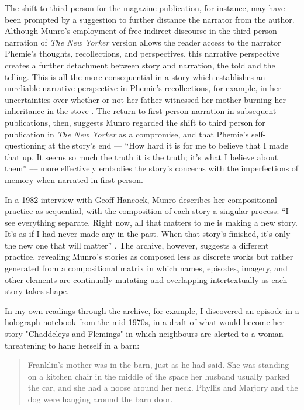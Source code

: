 \begin{paper}
The shift to third person for the magazine publication, for instance, may have been prompted by a suggestion to further distance the narrator from the author. Although Munro's employment of free indirect discourse in the
third-person narration of \emph{The New Yorker} version allows the
reader access to the narrator Phemie's thoughts, recollections, and
perspectives, this narrative perspective creates a further detachment
between story and narration, the told and the telling. This is all the
more consequential in a story which establishes an unreliable narrative
perspective in Phemie's recollections, for example, in her uncertainties
over whether or not her father witnessed her mother burning her
inheritance in the stove \citep[28--29]{munro_progress_1986}. The return to first person narration in subsequent publications, then, suggests Munro regarded the
shift to third person for publication in \emph{The New Yorker} as a
compromise, and that Phemie's self-questioning at the story's
end –– ``How hard it is for me to believe that I made that up. It seems
so much the truth it is the truth; it's what I believe about them''
\citep[30]{munro_progress_1986} –– more effectively embodies the story's concerns with
the imperfections of memory when narrated in first person.

In a 1982 interview with Geoff Hancock, Munro describes her
compositional practice as sequential, with the composition of each story
a singular process: ``I see everything separate. Right now, all that
matters to me is making a new story. It's as if I had never made any in
the past. When that story's finished, it's only the new one that will
matter'' \citep[77]{hancock_interview_1982}. The archive, however, suggests a different
practice, revealing Munro's stories as composed less as discrete works
but rather generated from a compositional matrix in which names,
episodes, imagery, and other elements are continually mutating and
overlapping intertextually as each story takes shape. 

In my own readings through the archive, for example, I discovered an episode in a holograph notebook from the mid-1970s, in a draft of what would become her story "Chaddeleys and Flemings" in which neighbours are alerted to a woman threatening to hang herself in a barn:

\begin{quote}
Franklin's mother was in the barn, just as he had said. She was standing on a kitchen chair in the middle of the space her husband usually parked the car, and she had a noose around her neck. Phyllis and Marjory and the dog were hanging around the barn door. 


\end{quote}
\end{paper}
